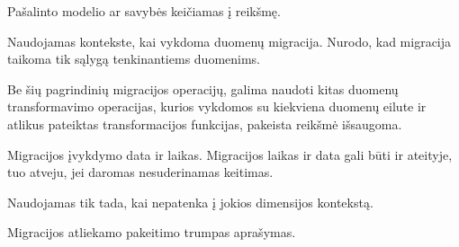 \documentclass[letterpaper,10pt,lithuanian]{sphinxmanual}
\begin{document}
\begin{fulllineitems}
\begin{fulllineitems}
\sphinxAtStartPar
Pašalinto modelio ar savybės {\hyperref[\detokenize{tipai:module-type}]{}} keičiamas į 
reikšmę.

\end{fulllineitems}


\begin{fulllineitems}
\label{\detokenize{dimensijos:migrate.filter}}
\pysigstartsignatures
{}
\pysigstopsignatures
\sphinxAtStartPar
Naudojamas {\hyperref[\detokenize{formatas:property}]{}} kontekste, kai vykdoma duomenų
migracija. Nurodo, kad migracija taikoma tik  sąlygą
tenkinantiems duomenims.

\end{fulllineitems}


\sphinxAtStartPar
Be šių pagrindinių migracijos operacijų, galima naudoti kitas duomenų
transformavimo operacijas, kurios vykdomos su kiekviena duomenų eilute
ir atlikus pateiktas transformacijos funkcijas, pakeista reikšmė
išsaugoma.

\end{fulllineitems}


\begin{fulllineitems}
\label{\detokenize{dimensijos:migrate.title}}
\pysigstartsignatures
{}
\pysigstopsignatures
\sphinxAtStartPar
Migracijos įvykdymo data ir laikas. Migracijos laikas ir data gali
būti ir ateityje, tuo atveju, jei daromas nesuderinamas keitimas.

\sphinxAtStartPar
Naudojamas tik tada, kai {\hyperref[\detokenize{dimensijos:module-migrate}]{}} nepatenka į jokios dimensijos
kontekstą.

\end{fulllineitems}


\begin{fulllineitems}
\label{\detokenize{dimensijos:migrate.description}}
\pysigstartsignatures
{}
\pysigstopsignatures
\sphinxAtStartPar
Migracijos atliekamo pakeitimo trumpas aprašymas.

\end{fulllineitems}
\end{document}
